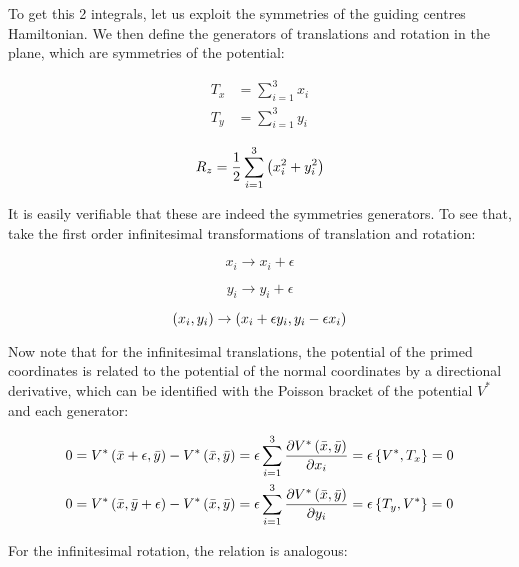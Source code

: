 To get this 2 integrals, let us exploit the symmetries of the guiding centres Hamiltonian. We then define the generators of translations and rotation in the plane, which are symmetries of the potential:

\begin{equation}
\begin{aligned}
T_x &= \sum_{i=1}^{3} x_i \\
T_y &= \sum_{i=1}^{3} y_i 
\end{aligned}
\label{eq:gentranslation}
\end{equation}


\begin{equation}
R_z = \frac{1}{2} \sum_{i=1}^{3} \left( x_i^2 + y_i^2 \right)
\label{eq:genrotation}
\end{equation}

It is easily verifiable that these are indeed the symmetries generators. To see that, take the first order infinitesimal transformations of translation and rotation:

\begin{equation*}
x_i  \rightarrow x_i + \epsilon 
\end{equation*}

\begin{equation*}
y_i \rightarrow y_i + \epsilon 
\end{equation*}

\begin{equation*}
\left( x_i,y_i \right) \rightarrow \left( x_i +\epsilon y_i, y_i - \epsilon x_i \right)
\end{equation*}

Now note that for the infinitesimal translations, the potential of the primed coordinates is related to the potential of the normal coordinates by a directional derivative, which can be identified with the Poisson bracket of the potential $V^*$ and each generator:

\begin{align*}
0={V^*\left( \bar{x}+\epsilon,\bar{y} \right) - V^*\left( \bar{x},\bar{y} \right)} &= \epsilon \sum_{i = 1}^3 \frac{\partial V^*\left( \bar{x},\bar{y} \right)}{\partial x_i}  = \epsilon \left\lbrace V^*, T_x \right\rbrace = 0\\
0={V^*\left( \bar{x},\bar{y}+\epsilon \right) - V^*\left( \bar{x},\bar{y} \right)} &= \epsilon \sum_{i = 1}^3 \frac{\partial V^*\left( \bar{x},\bar{y} \right)}{\partial y_i} = \epsilon \left\lbrace T_y, V^* \right\rbrace = 0
\end{align*}

For the infinitesimal rotation, the relation is analogous:

